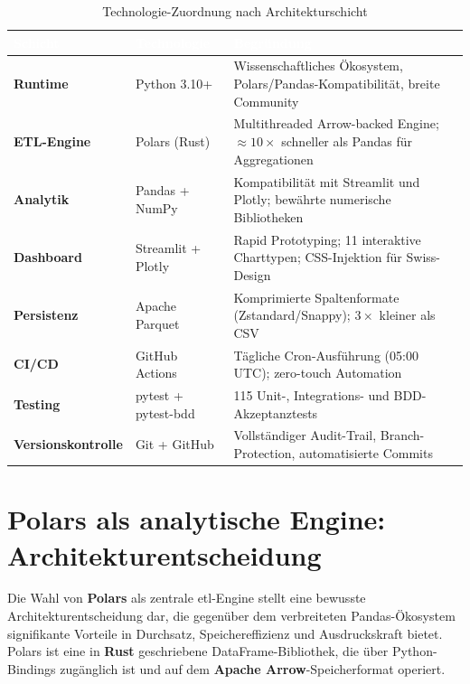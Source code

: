 \documentclass[11pt, a4paper, oneside, openany]{report}
\begin{document}
\begin{table}[H]
\centering
\caption{Technologie-Zuordnung nach Architekturschicht}
\label{tab:techstack}
\sffamily\small
\begin{tabularx}{\textwidth}{>{\bfseries}p{2.5cm} p{3.5cm} X}
  \toprule
  \rowcolor{DeepNavy} \textcolor{white}{\textbf{Schicht}} & \textcolor{white}{\textbf{Technologie}} & \textcolor{white}{\textbf{Begründung}} \\
  \midrule
  Runtime          & Python 3.10+         & Wissenschaftliches Ökosystem, Polars/Pandas-Kompatibilität, breite Community \\
  ETL-Engine       & Polars (Rust)        & Multithreaded Arrow-backed Engine; $\approx 10\times$ schneller als Pandas für Aggregationen \\
  Analytik         & Pandas + NumPy       & Kompatibilität mit Streamlit und Plotly; bewährte numerische Bibliotheken \\
  Dashboard        & Streamlit + Plotly   & Rapid Prototyping; 11 interaktive Charttypen; CSS-Injektion für Swiss-Design \\
  Persistenz       & Apache Parquet       & Komprimierte Spaltenformate (Zstandard/Snappy); $3\times$ kleiner als CSV \\
  CI/CD            & GitHub Actions       & Tägliche Cron-Ausführung (05:00\,UTC); zero-touch Automation \\
  Testing          & pytest + pytest-bdd  & 115 Unit-, Integrations- und BDD-Akzeptanztests \\
  Versionskontrolle & Git + GitHub        & Vollständiger Audit-Trail, Branch-Protection, automatisierte Commits \\
  \bottomrule
\end{tabularx}
\end{table}

\section{Polars als analytische Engine: Architekturentscheidung}
\label{sec:polars}

Die Wahl von \textbf{Polars} als zentrale \gls{etl}-Engine stellt eine bewusste Architekturentscheidung dar, die gegenüber dem verbreiteten Pandas-Ökosystem signifikante Vorteile in Durchsatz, Speichereffizienz und Ausdruckskraft bietet. Polars ist eine in \textbf{Rust} geschriebene DataFrame-Bibliothek, die über Python-Bindings zugänglich ist und auf dem \textbf{Apache Arrow}-Speicherformat operiert.
\end{document}
